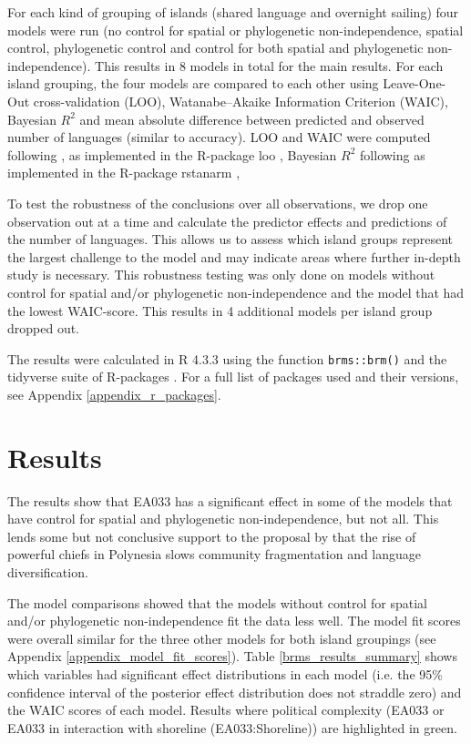 \documentclass[unnumsec,webpdf,modern,medium]{oup-authoring-template}
\begin{document}
For each kind of grouping of islands (shared language and overnight sailing) four models were run (no control for spatial or phylogenetic non-independence, spatial control, phylogenetic control and control for both spatial and phylogenetic non-independence). This results in 8 models in total for the main results. For each island grouping, the four models are compared to each other using Leave-One-Out cross-validation (LOO), Watanabe–Akaike Information Criterion (WAIC), Bayesian $R^2$ and mean absolute difference between predicted and observed number of languages (similar to accuracy). LOO and WAIC were computed following  \citet{vehtari2017practical}, as implemented in the R-package loo \citep{R-loo}, Bayesian $R^2$ following \citet{gelman2019r} as implemented in the R-package rstanarm \citep{R-rstanarm},

To test the robustness of the conclusions over all observations, we drop one observation out at a time and calculate the predictor effects and predictions of the number of languages. This allows us to assess which island groups represent the largest challenge to the model and may indicate areas where further in-depth study is necessary. This robustness testing was only done on models without control for spatial and/or phylogenetic non-independence and the model that had the lowest WAIC-score. This results in 4 additional models per island group dropped out.

The results were calculated in R 4.3.3 \citep{R} using the function \texttt{brms::brm()} \citep{burkner2017brms} and the tidyverse suite of R-packages \citep{tidyverse13}. For a full list of packages used and their versions, see Appendix \ref{appendix_r_packages}.

\FloatBarrier
\section{Results}
The results show that EA033 has a significant effect in some of the models that have control for spatial and phylogenetic non-independence, but not all. This lends some but not conclusive support to the proposal by \citet{pawley81, pawley2007} that the rise of powerful chiefs in Polynesia slows community fragmentation and language diversification.


The model comparisons showed that the models without control for spatial and/or phylogenetic non-independence fit the data less well. The model fit scores were overall similar for the three other models for both island groupings (see Appendix \ref{appendix_model_fit_scores}). Table \ref{brms_results_summary} shows which variables had significant effect distributions in each model (i.e. the 95\% confidence interval of the posterior effect distribution does not straddle zero) and the WAIC scores of each model. Results where political complexity (EA033 or EA033 in interaction with shoreline (EA033:Shoreline)) are highlighted in green.
\end{document}
